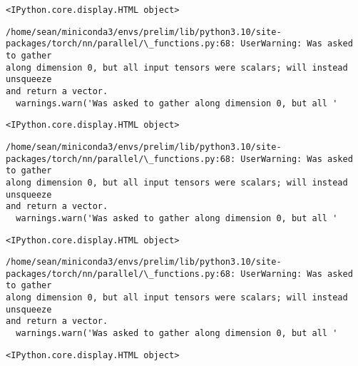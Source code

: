 \documentclass[11pt]{article}
\begin{document}
    
    \begin{Verbatim}[commandchars=\\\{\}]
<IPython.core.display.HTML object>
    \end{Verbatim}

    
    \begin{Verbatim}[commandchars=\\\{\}]
/home/sean/miniconda3/envs/prelim/lib/python3.10/site-
packages/torch/nn/parallel/\_functions.py:68: UserWarning: Was asked to gather
along dimension 0, but all input tensors were scalars; will instead unsqueeze
and return a vector.
  warnings.warn('Was asked to gather along dimension 0, but all '
    \end{Verbatim}

    
    \begin{Verbatim}[commandchars=\\\{\}]
<IPython.core.display.HTML object>
    \end{Verbatim}

    
    \begin{Verbatim}[commandchars=\\\{\}]
/home/sean/miniconda3/envs/prelim/lib/python3.10/site-
packages/torch/nn/parallel/\_functions.py:68: UserWarning: Was asked to gather
along dimension 0, but all input tensors were scalars; will instead unsqueeze
and return a vector.
  warnings.warn('Was asked to gather along dimension 0, but all '
    \end{Verbatim}

    
    \begin{Verbatim}[commandchars=\\\{\}]
<IPython.core.display.HTML object>
    \end{Verbatim}

    
    \begin{Verbatim}[commandchars=\\\{\}]
/home/sean/miniconda3/envs/prelim/lib/python3.10/site-
packages/torch/nn/parallel/\_functions.py:68: UserWarning: Was asked to gather
along dimension 0, but all input tensors were scalars; will instead unsqueeze
and return a vector.
  warnings.warn('Was asked to gather along dimension 0, but all '
    \end{Verbatim}

    
    \begin{Verbatim}[commandchars=\\\{\}]
<IPython.core.display.HTML object>
    \end{Verbatim}
\end{document}
